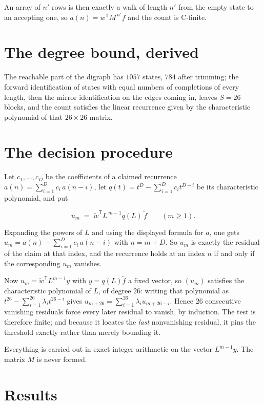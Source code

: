 \documentclass[11pt]{article}
\theoremstyle{definition}
\begin{document}
An array of $n'$ rows is then exactly a walk of length $n'$ from the empty state to an accepting one, so $a(n) = w^{\mathsf T}M^{\,n'}f$ and the count is C-finite.

\section{The degree bound, derived}

The reachable part of the digraph has $1057$ states, $784$ after trimming; the forward identification of states with equal numbers of completions of every length, then the mirror identification on the edges coming in, leaves $S = 26$ blocks, and the count satisfies the linear recurrence given by the characteristic polynomial of that $26\times26$ matrix.

\section{The decision procedure}

Let $c_1,\dots,c_D$ be the coefficients of a claimed recurrence $a(n) = \sum_{i=1}^{D} c_i\,a(n-i)$, let $q(t) = t^{D} - \sum_{i=1}^{D} c_i t^{D-i}$ be its characteristic polynomial, and put

\[u_m \;=\; \tilde w^{\mathsf T} L^{\,m-1} q(L)\,\tilde f \qquad (m \ge 1).\]

Expanding the powers of $L$ and using the displayed formula for $a$, one gets $u_m = a(n) - \sum_{i=1}^{D} c_i\,a(n-i)$ with $n = m + D$. So $u_m$ is exactly the residual of the claim at that index, and the recurrence holds at an index $n$ if and only if the corresponding $u_m$ vanishes.

Now $u_m = \tilde w^{\mathsf T} L^{m-1} y$ with $y = q(L)\tilde f$ a fixed vector, so $(u_m)$ satisfies the characteristic polynomial of $L$, of degree $26$: writing that polynomial as $t^{26} - \sum_{i=1}^{26} \lambda_i t^{26-i}$ gives $u_{m+26} = \sum_{i=1}^{26} \lambda_i u_{m+26-i}$. Hence $26$ consecutive vanishing residuals force every later residual to vanish, by induction. The test is therefore finite; and because it locates the {\itshape last} nonvanishing residual, it pins the threshold exactly rather than merely bounding it.

Everything is carried out in exact integer arithmetic on the vector $L^{m-1}y$. The matrix $M$ is never formed.

\section{Results}
\end{document}
